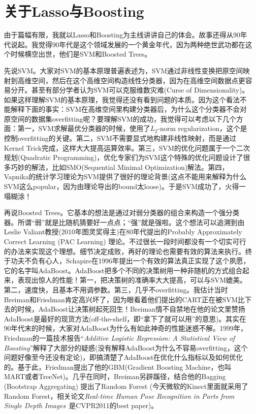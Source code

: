 \documentclass{cosart-xetex}
\begin{document}
\section{关于Lasso与Boosting}
由于篇幅有限，我就以Lasso和Boosting为主线讲讲自己的体会。故事还得从90年代说起。我觉得90年代是这个领域发展的一个黄金年代，因为两种绝世武功都在这个时候横空出世，他们是SVM和Boosted Trees。



先说SVM。大家对SVM的基本原理普遍表述为，SVM通过非线性变换把原空间映射到高维空间，然后在这个高维空间构造线性分类器，因为在高维空间数据点更容易分开。甚至有部分学者认为SVM可以克服维数灾难(Curse of Dimensionality)。如果这样理解SVM的基本原理，我觉得还没有看到问题的本质。因为这个看法不能解释下面的事实：SVM在高维空间里构建分类器后，为什么这个分类器不会对原空间的数据集overfitting呢？要理解SVM的成功，我觉得可以考虑以下几个方面：第一，SVM求解最优分类器的时候，使用了$L_2$-norm regularization，这个是控制overfitting的关键。第二，SVM不需要显式地构建非线性映射，而是通过Kernel Trick完成，这样大大提高运算效率。第三，SVM的优化问题属于一个二次规划(Quadratic Programming)，优化专家们为SVM这个特殊的优化问题设计了很多巧妙的解法，比如SMO(Sequential Minimal Optimization)解法。第四，Vapnika的统计学习理论为SVM提供了很好的理论背景(这点不能用来解释为什么SVM这么popular，因为由理论导出的bound太loose)。于是SVM成功了，火得一塌糊涂！

再说Boosted Trees。它基本的想法是通过对弱分类器的组合来构造一个强分类器。所谓“弱”就是比随机猜要好一点点；“强”就是强啦。这个想法可以追溯到由Leslie Valiant教授(2010年图灵奖得主)在80年代提出的Probably Approximately Correct Learning (PAC Learning) 理论。不过很长一段时间都没有一个切实可行的办法来实现这个理想。细节决定成败，再好的理论也需要有效的算法来执行。终于功夫不负有心人，Schapire在1996年提出一个有效的算法真正实现了这个夙愿，它的名字叫AdaBoost。AdaBoost把多个不同的决策树用一种非随机的方式组合起来，表现出惊人的性能！第一，把决策树的准确率大大提高，可以与SVM媲美。第二，速度快，且基本不用调参数。第三，几乎不overfitting。我估计当时Breiman和Friedman肯定高兴坏了，因为眼看着他们提出的CART正在被SVM比下去的时候，AdaBoost让决策树起死回生！Breiman情不自禁地在他的论文里赞扬AdaBoost是最好的现货方法(off-the-shelf，即“拿下了就可以用”的意思)。其实在90年代末的时候，大家对AdaBoost为什么有如此神奇的性能迷惑不解。1999年，Friedman的一篇技术报告“\textit{Additive Logistic Regression: A Statistical View of Boosting}”解释了大部分的疑惑(没有解释AdaBoost为什么不容易overfitting，这个问题好像至今还没有定论)，即搞清楚了AdaBoost在优化什么指标以及如何优化的。基于此，Friedman提出了他的GBM(Gradient Boosting Machine，也叫MART或者TreeNet)。几乎在同时，Breiman另辟蹊径，结合他的Bagging (Bootstrap Aggregating) 提出了Random Forest (今天微软的Kinect里面就采用了Random Forest，相关论文\textit{Real-time Human Pose Recognition in Parts from Single Depth Images}~是CVPR2011的best paper)。
\end{document}
